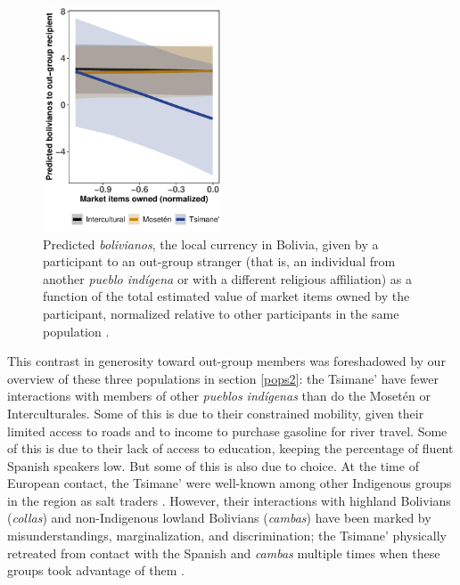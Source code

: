 \documentclass[bibauthoryear]{aa}
\begin{document}
 \begin{figure}[t]
	\centering
	\includegraphics[width=2.1in]{Market_items}
	\caption{{\footnotesize Predicted \textit{bolivianos}, the local currency in Bolivia, given by a participant to an out-group stranger (that is, an individual from another \textit{pueblo ind\'igena} or with a different religious affiliation) as a function of the total estimated value of market items owned by the participant, normalized relative to other participants in the same population \citep{pisor2016risk, pisor2018diversify}.}} \label{boliviamarket}
\end{figure}

This contrast in generosity toward out-group members was foreshadowed by our overview of these three populations in section \ref{pops2}: the Tsimane' have fewer interactions with members of other \textit{pueblos ind\'igenas} than do the Moset\'en or Interculturales. Some of this is due to their constrained mobility, given their limited access to roads and to income to purchase gasoline for river travel. Some of this is due to their lack of access to education, keeping the percentage of fluent Spanish speakers low. But some of this is also due to choice. At the time of European contact, the Tsimane' were well-known among other Indigenous groups in the region as salt traders \citep{godoy2015natural,  ref947717999}. However, their interactions with highland Bolivians (\textit{collas}) and non-Indigenous lowland Bolivians (\textit{cambas}) have been marked by misunderstandings, marginalization, and discrimination; the Tsimane' physically retreated from contact with the Spanish and \textit{cambas} multiple times when these groups took advantage of them \citep{godoy2015natural, ringhofer2010exploring, tomas2008tsimane}. 
\end{document}
